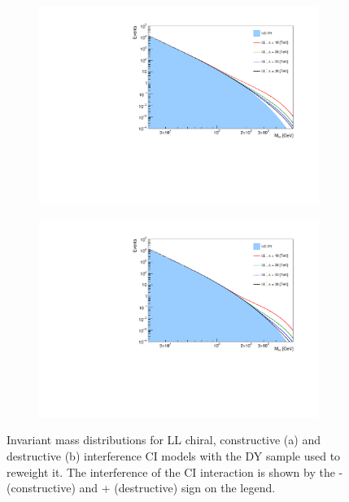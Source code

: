 \begin{figure}[]
    \centering
    \begin{subfigure}[b]{0.49\textwidth}
        \centering
        \includegraphics[width=\textwidth]{figures/analysis/datamc/sigmodel/constSigsOverlay.pdf}
        \caption{}
        \label{fig:datamc:sigconstoverlays}
    \end{subfigure}
    \begin{subfigure}[b]{0.49\textwidth}
        \centering
        \includegraphics[width=\textwidth]{figures/analysis/datamc/sigmodel/destSigsOverlay.pdf}
        \caption{}
        \label{fig:datamc:sigdestoverlays}
    \end{subfigure}
    \caption[Invariant mass distribution for reweighted CI LL chiral signal models]{Invariant mass distributions for LL chiral, constructive (a) and destructive (b) interference CI models with the DY sample used to reweight it. The interference of the CI interaction is shown by the - (constructive) and + (destructive) sign on the legend.}
    \label{fig:datamc:sigoverlays}
\end{figure}

